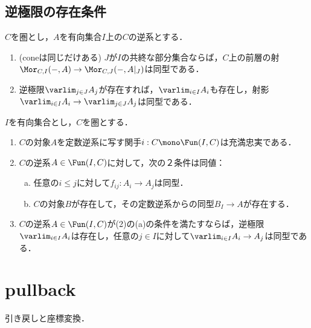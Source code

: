 \documentclass[uplatex,dvipdfmx]{jsreport}
\begin{document}
\subsection{逆極限の存在条件}

\begin{proposition}
    $C$を圏とし，$A$を有向集合$I$上の$C$の逆系とする．
    \begin{enumerate}
        \item (coneは同じだけある) $J$が$I$の共終な部分集合ならば，$C$上の前層の射$\Mor_{C,I}(-,A)\to\Mor_{C,J}(-,A|_J)$は同型である．
        \item 逆極限$\varlim_{j\in J}A_j$が存在すれば，$\varlim_{i\in I}A_i$も存在し，射影$\varlim_{i\in I}A_i\to\varlim_{j\in J}A_j$は同型である．
    \end{enumerate}
\end{proposition}

\begin{proposition}
    $I$を有向集合とし，$C$を圏とする．
    \begin{enumerate}
        \item $C$の対象$A$を定数逆系に写す関手$i:C\mono\Fun(I,C)$は充満忠実である．
        \item $C$の逆系$A\in\Fun(I,C)$に対して，次の２条件は同値：
        \begin{enumerate}[(a)]
            \item 任意の$i\le j$に対して$f_{ij}:A_i\to A_j$は同型．
            \item $C$の対象$B$が存在して，その定数逆系からの同型$B_I\to A$が存在する．
        \end{enumerate}
        \item $C$の逆系$A\in\Fun(I,C)$が(2)の(a)の条件を満たすならば，逆極限$\varlim_{i\in I}A_i$は存在し，任意の$j\in I$に対して$\varlim_{i\in I}A_i\to A_j$は同型である．
    \end{enumerate}
\end{proposition}

\section{pullback}

\begin{tcolorbox}[colframe=ForestGreen, colback=ForestGreen!10!white, breakable ,colbacktitle=ForestGreen!40!white, coltitle=black,fonttitle=\bfseries\sffamily,
    title=pullback is limit over a cospan]
    引き戻しと座標変換．
\end{tcolorbox}
\end{document}
